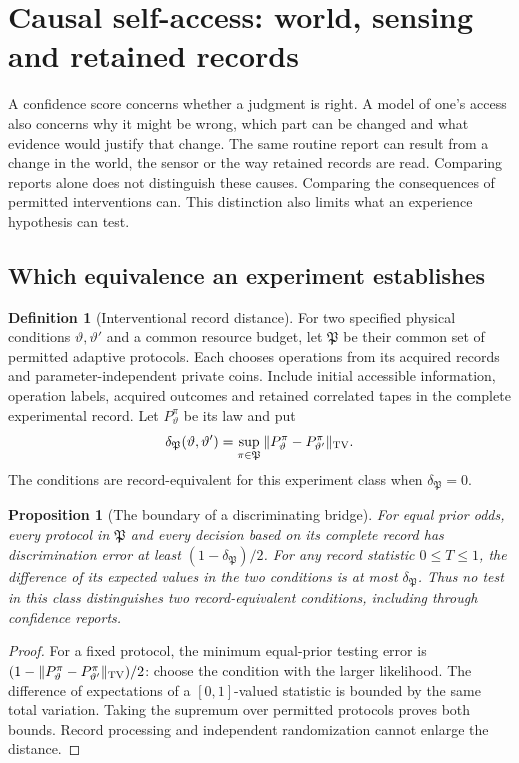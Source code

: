 \documentclass[12pt]{article}
\newtheorem{proposition}[theorem]{Proposition}
\theoremstyle{definition}
\newtheorem{definition}[theorem]{Definition}
\theoremstyle{remark}
\begin{document}
\section{Causal self-access: world, sensing and retained records}
\label{sec:causal}

A confidence score concerns whether a judgment is right. A model of
one's access also concerns why it might be wrong, which part can be
changed and what evidence would justify that change. The same routine
report can result from a change in the world, the sensor or the way
retained records are read. Comparing reports alone does not distinguish
these causes. Comparing the consequences of permitted interventions can.
This distinction also limits what an experience hypothesis can test.

\subsection{Which equivalence an experiment establishes}

\begin{definition}[Interventional record distance]\label{def:intervention}
For two specified physical conditions $\vartheta,\vartheta'$ and a common
resource budget, let $\mathfrak P$ be their common set of permitted
adaptive protocols. Each chooses operations from its acquired records
and parameter-independent private coins. Include initial accessible
information, operation labels, acquired outcomes and retained correlated
tapes in the complete experimental record. Let $P_\vartheta^\pi$ be its
law and put
\[
 \delta_{\mathfrak P}(\vartheta,\vartheta')
 =\sup_{\pi\in\mathfrak P}
   \|P_\vartheta^\pi-P_{\vartheta'}^\pi\|_{\rm TV}.
\]
The conditions are record-equivalent for this experiment class when
$\delta_{\mathfrak P}=0$.
\end{definition}

\begin{proposition}[The boundary of a discriminating bridge]
\label{prop:bridge_boundary}
For equal prior odds, every protocol in $\mathfrak P$ and every decision
based on its complete record has discrimination error at least
$(1-\delta_{\mathfrak P})/2$. For any record statistic $0\le T\le1$,
the difference of its expected values in the two conditions is at most
$\delta_{\mathfrak P}$. Thus no test in this class distinguishes two
record-equivalent conditions, including through confidence reports.
\end{proposition}
\begin{proof}
For a fixed protocol, the minimum equal-prior testing error is
$(1-\|P_\vartheta^\pi-P_{\vartheta'}^\pi\|_{\rm TV})/2$: choose the
condition with the larger likelihood. The difference of expectations of
a $[0,1]$-valued statistic is bounded by the same total variation.
Taking the supremum over permitted protocols proves both bounds.
Record processing and independent randomization cannot enlarge the
distance.
\end{proof}
\end{document}
